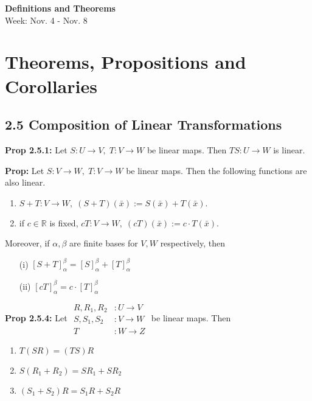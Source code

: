 \noindent
\textbf{\LARGE Definitions and Theorems} \\
\large Week: Nov. 4 - Nov. 8

\normalsize

\section*{Theorems, Propositions and Corollaries}

\subsection*{2.5 Composition of Linear Transformations}

\textbf{Prop 2.5.1:} Let $S: U \rightarrow V, \; T: V \rightarrow W$ be linear maps. Then $TS: U \rightarrow W$ is linear.

\bigskip

\noindent
\textbf{Prop:} Let $S: V \rightarrow W, \; T: V \rightarrow W$ be linear maps. Then the following functions are also linear. 
\begin{enumerate}
    \item $S + T: V \rightarrow W, \; (S + T)(\bar x) := S(\bar x) + T(\bar x).$
    \item if $c \in \mathbb{R}$ is fixed, $cT: V \rightarrow W,\; (cT)(\bar x) := c \cdot T(\bar x)$.
\end{enumerate}
Moreover, if $\alpha, \beta$ are finite bases for $V, W$ respectively, then
\begin{itemize}
    \item[(i)] $[S + T]_\alpha^\beta = [S]_\alpha^\beta + [T]_\alpha^\beta$
    \item[(ii)] $[cT]_\alpha^\beta = c \cdot [T]_\alpha^\beta$
\end{itemize}

\bigskip 

\noindent 
\textbf{Prop 2.5.4:} 
Let
$\begin{aligned}
    R, R_1, R_2 &: U \rightarrow V \\
    S, S_1, S_2 &: V \rightarrow W \\ 
    T &: W \rightarrow Z
\end{aligned}$ be linear maps. Then 
\begin{enumerate}
    \item $T(SR) = (TS)R$
    \item $S(R_1 + R_2) = SR_1 + SR_2$
    \item $(S_1 + S_2)R = S_1R + S_2R$
\end{enumerate}


